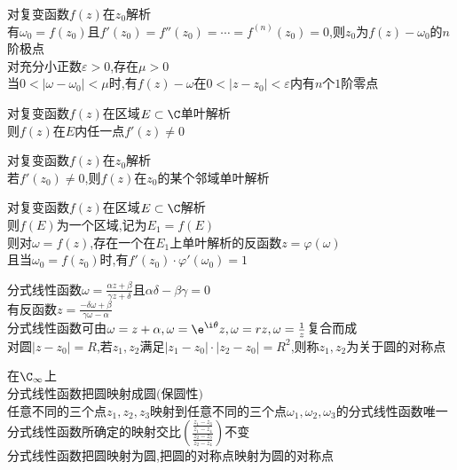 \begin{dingli}
对复变函数$f(z)$在$z_0$解析\\
有$\omega_0=f(z_0)$且$f'(z_0)=f''(z_0)=\cdots=f^{(n)}(z_0)=0$,则$z_0$为$f(z)-\omega_0$的$n$阶极点\\
对充分小正数$\varepsilon>0$,存在$\mu>0$\\
当$0<|\omega-\omega_0|<\mu$时,有$f(z)-\omega$在$0<|z-z_0|<\varepsilon$内有$n$个$1$阶零点
\end{dingli}

\begin{dingli}
对复变函数$f(z)$在区域$E\subset\C$单叶解析\\
则$f(z)$在$E$内任一点$f'(z)\neq0$
\end{dingli}

\begin{dingli}
对复变函数$f(z)$在$z_0$解析\\
若$f'(z_0)\neq 0$,则$f(z)$在$z_0$的某个邻域单叶解析
\end{dingli}

\begin{dingli}
对复变函数$f(z)$在区域$E\subset\C$解析\\
则$f(E)$为一个区域,记为$E_1=f(E)$\\
则对$\omega=f(z)$,存在一个在$E_1$上单叶解析的反函数$z=\varphi(\omega)$\\
且当$\omega_0=f(z_0)$时,有$f'(z_0)\cdot\varphi'(\omega_0)=1$
\end{dingli}

\begin{dingyi}
分式线性函数$\omega=\frac{\alpha z+\beta}{\gamma z+\delta}$且$\alpha\delta-\beta\gamma=0$\\
有反函数$z=\frac{-\delta \omega+\beta}{\gamma \omega-\alpha}$\\
分式线性函数可由$\omega=z+\alpha,\omega=\e^{\i\theta}z,\omega=rz,\omega=\frac{1}{z}$复合而成\\
对圆$|z-z_0|=R$,若$z_1,z_2$满足$|z_1-z_0|\cdot|z_2-z_0|=R^2$,则称$z_1,z_2$为关于圆的对称点
\end{dingyi}

\begin{dingli}
在$\C_{\infty}$上\\
分式线性函数把圆映射成圆$($保圆性$)$\\
任意不同的三个点$z_1,z_2,z_3$映射到任意不同的三个点$\omega_1,\omega_2,\omega_3$的分式线性函数唯一\\
分式线性函数所确定的映射交比$(\frac{\frac{z_1-z_3}{z_1-z_4}}{\frac{z_2-z_3}{z_2-z_4}})$不变\\
分式线性函数把圆映射为圆,把圆的对称点映射为圆的对称点
\end{dingli}

